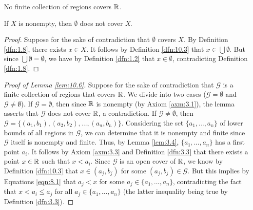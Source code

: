 \documentclass[../main.tex]{subfiles}
\begin{document}
\begin{lemma}\label{lem:10.6}
    No finite collection of regions covers $\mathbb{R}$.
    \begin{lemma*}
        If $X$ is nonempty, then $\emptyset$ does not cover $X$.
        \begin{proof}
            Suppose for the sake of contradiction that $\emptyset$ covers $X$. By Definition \ref{dfn:1.8}, there exists $x\in X$. It follows by Definition \ref{dfn:10.3} that $x\in\bigcup\emptyset$. But since $\bigcup\emptyset=\emptyset$, we have by Definition \ref{dfn:1.2} that $x\in\emptyset$, contradicting Definition \ref{dfn:1.8}.
        \end{proof}
    \end{lemma*}
    \begin{proof}[Proof of Lemma \ref{lem:10.6}]
        Suppose for the sake of contradiction that $\mathcal{G}$ is a finite collection of regions that covers $\mathbb{R}$. We divide into two cases ($\mathcal{G}=\emptyset$ and $\mathcal{G}\neq\emptyset$). If $\mathcal{G}=\emptyset$, then since $\mathbb{R}$ is nonempty (by Axiom \ref{axm:3.1}), the lemma asserts that $\mathcal{G}$ does not cover $\mathbb{R}$, a contradiction. If $\mathcal{G}\neq\emptyset$, then $\mathcal{G}=\{(a_1,b_1),(a_2,b_2),\dots,(a_n,b_n)\}$. Considering the set $\{a_1,\dots,a_n\}$ of lower bounds of all regions in $\mathcal{G}$, we can determine that it is nonempty and finite since $\mathcal{G}$ itself is nonempty and finite. Thus, by Lemma \ref{lem:3.4}, $\{a_1,\dots,a_n\}$ has a first point $a_i$. It follows by Axiom \ref{axm:3.3} and Definition \ref{dfn:3.3} that there exists a point $x\in\mathbb{R}$ such that $x<a_i$. Since $\mathcal{G}$ is an open cover of $\mathbb{R}$, we know by Definition \ref{dfn:10.3} that $x\in(a_j,b_j)$ for some $(a_j,b_j)\in\mathcal{G}$. But this implies by Equations \ref{eqn:8.1} that $a_j<x$ for some $a_j\in\{a_1,\dots,a_n\}$, contradicting the fact that $x<a_i\leq a_j$ for all $a_j\in\{a_1,\dots,a_n\}$ (the latter inequality being true by Definition \ref{dfn:3.3}).
    \end{proof}
\end{lemma}
\end{document}
